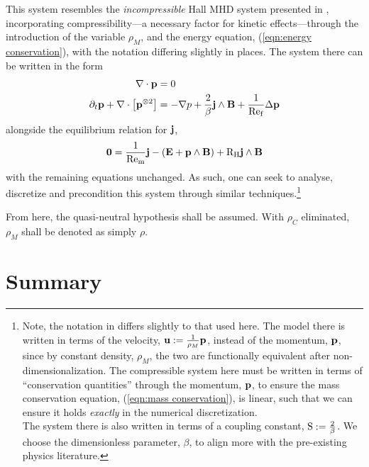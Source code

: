     This system resembles the \emph{incompressible} Hall MHD system presented in \cite{LHF22}, incorporating compressibility—a necessary factor for kinetic effects—through the introduction of the variable $\rho_{M}$, and the energy equation, (\ref{eqn:energy conservation}), with the notation differing slightly in places. The system there can be written in the form
    \begin{align}
        \nabla\cdot\mathbf{p}  &=  0  \label{eqn:incompressible mass conservation} 
         \\
        \partial_{t}\mathbf{p} + \nabla\cdot\left[\mathbf{p}^{\otimes 2}\right]  &=  - \nabla p + \frac{2}{\beta}\mathbf{j}\wedge\mathbf{B} + \frac{1}{\mathrm{Re}_{\mathrm{f}}}\Delta\mathbf{p}  \label{eqn:incompressible momentum conservation}
    \end{align}
    alongside the equilibrium relation for $\mathbf{j}$,
    \begin{equation}\label{eqn:current identity}
        \mathbf{0}  =  \frac{1}{\mathrm{Re}_{\mathrm{m}}}\mathbf{j} - (\mathbf{E} + \mathbf{p}\wedge\mathbf{B}) + \mathrm{R}_{\mathrm{H}}\mathbf{j}\wedge\mathbf{B}
    \end{equation}
    with the remaining equations unchanged. As such, one can seek to analyse, discretize and precondition this system through similar techniques.\footnote{Note, the notation in \cite{LHF22} differs slightly to that used here. The model there is written in terms of the velocity, $\mathbf{u}  :=  \frac{1}{\rho_{M}}\mathbf{p}$, instead of the momentum, $\mathbf{p}$, since by constant density, $\rho_{M}$, the two are functionally equivalent after non-dimensionalization. The compressible system here must be written in terms of ``conservation quantities'' through the momentum, $\mathbf{p}$, to ensure the mass conservation equation, (\ref{eqn:mass conservation}), is linear, such that we can ensure it holds \emph{exactly} in the numerical discretization. \\ The system there is also written in terms of a coupling constant, $\mathrm{S}  :=  \frac{2}{\beta}$. We choose the dimensionless parameter, $\beta$, to align more with the pre-existing physics literature. \BA{([Ref])}}

    From here, the quasi-neutral hypothesis shall be assumed. With $\rho_{C}$ eliminated, $\rho_{M}$ shall be denoted as simply $\rho$.
    

    
    
    
    
    

    
    \section*{Summary}
    